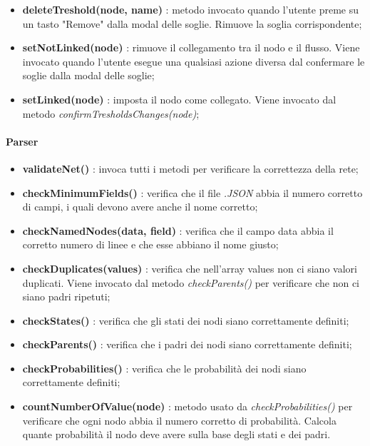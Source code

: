 \begin{itemize}
				\item \textbf{deleteTreshold(node, name)} : metodo invocato quando l'utente preme su un tasto "Remove" dalla modal delle soglie. Rimuove la soglia corrispondente;
				\item \textbf{setNotLinked(node)} : rimuove il collegamento tra il nodo e il flusso. Viene invocato quando l'utente esegue una qualsiasi azione diversa dal confermare le soglie dalla modal delle soglie;
				\item \textbf{setLinked(node)} : imposta il nodo come collegato. Viene invocato dal metodo \textit{confirmTresholdsChanges(node)};
			\end{itemize}
		
		 \paragraph{Parser} 
			\begin{itemize}
				\item \textbf{validateNet()} : invoca tutti i metodi per verificare la correttezza della rete;
				\item \textbf{checkMinimumFields()} : verifica che il file \textit{.JSON} abbia il numero corretto di campi, i quali devono avere anche il nome corretto;
				\item \textbf{checkNamedNodes(data, field)} : verifica che il campo data abbia il corretto numero di linee e che esse abbiano il nome giusto;
				\item \textbf{checkDuplicates(values)} : verifica che nell'array values non ci siano valori duplicati. Viene invocato dal metodo \textit{checkParents()} per verificare che non ci siano padri ripetuti;
				\item \textbf{checkStates()} : verifica che gli stati dei nodi siano correttamente definiti;
				\item \textbf{checkParents()} : verifica che i padri dei nodi siano correttamente definiti;
				\item \textbf{checkProbabilities()} : verifica che le probabilità dei nodi siano correttamente definiti;
				\item \textbf{countNumberOfValue(node)} : metodo usato da \textit{checkProbabilities()} per verificare che ogni nodo abbia il numero corretto di probabilità. Calcola quante probabilità il nodo deve avere sulla base degli stati e dei padri.
			\end{itemize}
